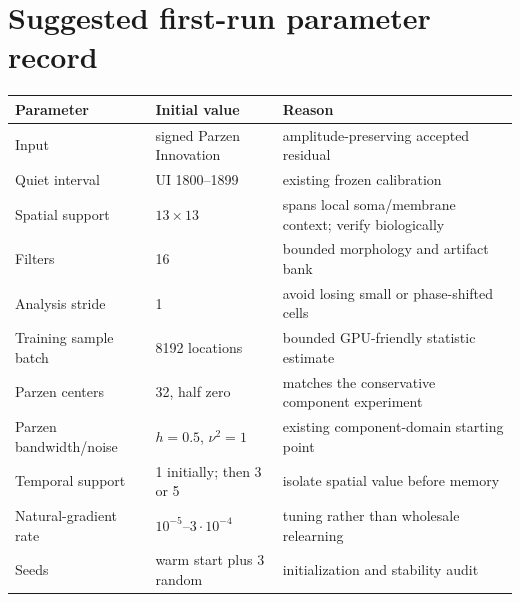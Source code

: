 \documentclass[11pt]{article}
\begin{document}
\section{Suggested first-run parameter record}

\begin{table}[H]
\centering
\begin{tabularx}{\textwidth}{@{}p{}p{}X@{}}
\toprule
Parameter & Initial value & Reason\\
\midrule
Input & signed Parzen Innovation & amplitude-preserving accepted residual\\
Quiet interval & UI 1800--1899 & existing frozen calibration\\
Spatial support & $13\times13$ & spans local soma/membrane context; verify biologically\\
Filters & 16 & bounded morphology and artifact bank\\
Analysis stride & 1 & avoid losing small or phase-shifted cells\\
Training sample batch & 8192 locations & bounded GPU-friendly statistic estimate\\
Parzen centers & 32, half zero & matches the conservative component experiment\\
Parzen bandwidth/noise & $h=0.5$, $\nu^2=1$ & existing component-domain starting point\\
Temporal support & 1 initially; then 3 or 5 & isolate spatial value before memory\\
Natural-gradient rate & $10^{-5}$--$3\cdot10^{-4}$ & tuning rather than wholesale relearning\\
Seeds & warm start plus 3 random & initialization and stability audit\\
\bottomrule
\end{tabularx}
\end{table}
\end{document}
